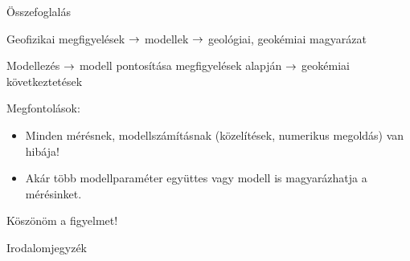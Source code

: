 \documentclass{beamer}
\begin{document}
\begin{frame}{Összefoglalás}

    {\Large
    Geofizikai megfigyelések $\rightarrow$ modellek $\rightarrow$ geológiai, geokémiai magyarázat
    \vspace{20pt}
    
    Modellezés $\rightarrow$ modell pontosítása megfigyelések alapján $\rightarrow$ geokémiai következtetések
    }
    \vspace{20pt}
    
    Megfontolások:
    \begin{itemize}
        \item Minden mérésnek, modellszámításnak (közelítések, numerikus megoldás) van hibája!
        \item Akár több modellparaméter együttes vagy modell is magyarázhatja a mérésinket.
    \end{itemize}
\end{frame}


\begin{frame}
    \begin{center}
        \Huge \color{blue!55!black}
        Köszönöm a figyelmet!
    \end{center}
\end{frame}


\begin{frame}{Irodalomjegyzék}
    {\tiny
    
    }
\end{frame}
\end{document}
